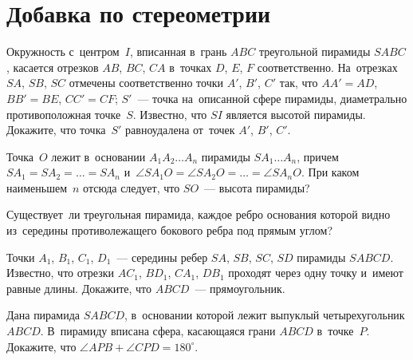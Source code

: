 
\section*{Добавка по стереометрии}



\begin{problems}


\item
Окружность с~центром~$I$, вписанная в~грань $ABC$ треугольной пирамиды $SABC$,
касается отрезков $AB$, $BC$, $CA$ в~точках $D$, $E$, $F$ соответственно.
На~отрезках $SA$, $SB$, $SC$ отмечены соответственно точки $A'$, $B'$, $C'$
так, что $AA' = AD$, $BB' = BE$, $CC' = CF$;
$S'$~--- точка на~описанной сфере пирамиды, диаметрально противоположная
точке~$S$.
Известно, что $SI$ является высотой пирамиды.
Докажите, что точка~$S'$ равноудалена от~точек $A'$, $B'$, $C'$.

\item
Точка~$O$ лежит в~основании $A_1 A_2 \ldots A_n$ пирамиды $S A_1 \ldots A_n$,
причем $S A_1 = S A_2 = \ldots = S A_n$
и~$\angle S A_1 O = \angle S A_2 O = \ldots = \angle S A_n O$.
При каком наименьшем~$n$ отсюда следует, что $SO$~--- высота пирамиды?

\item
Существует~ли треугольная пирамида, каждое ребро основания которой видно
из~середины противолежащего бокового ребра под прямым углом?

\item
Точки $A_1$, $B_1$, $C_1$, $D_1$~--- середины ребер $SA$, $SB$, $SC$, $SD$
пирамиды $SABCD$.
Известно, что отрезки $A C_1$, $B D_1$, $C A_1$, $D B_1$ проходят через одну
точку и~имеют равные длины.
Докажите, что $ABCD$~--- прямоугольник.

\item
Дана пирамида $SABCD$, в~основании которой лежит выпуклый четырехугольник
$ABCD$.
В~пирамиду вписана сфера, касающаяся грани $ABCD$ в~точке~$P$.
Докажите, что $\angle APB + \angle CPD = 180^\circ$.


\end{problems}
